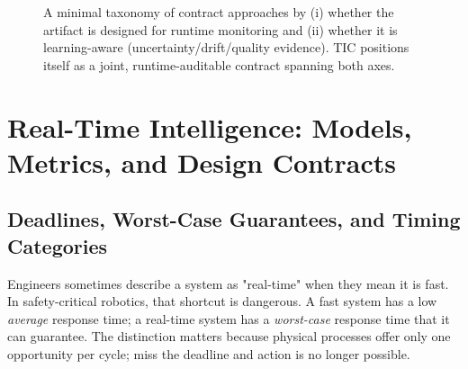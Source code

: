 \documentclass[smallextended]{svjour3}
\begin{document}
\begin{figure}[htbp]
  \centering
  \caption{A minimal taxonomy of contract approaches by (i) whether the artifact is designed for runtime monitoring and (ii) whether it is learning-aware (uncertainty/drift/quality evidence). TIC positions itself as a joint, runtime-auditable contract spanning both axes.}
  \label{fig:taxonomy}
\end{figure}

\section{Real-Time Intelligence: Models, Metrics, and Design Contracts}
\label{sec:rt}

\subsection{Deadlines, Worst-Case Guarantees, and Timing Categories}

Engineers sometimes describe a system as "real-time" when they mean it is fast. In safety-critical robotics, that shortcut is dangerous. A fast system has a low \emph{average} response time; a real-time system has a  \emph{worst-case}
response time that it can guarantee. The distinction matters because physical processes offer only one opportunity per cycle; miss the deadline and action is no longer possible.
\end{document}
